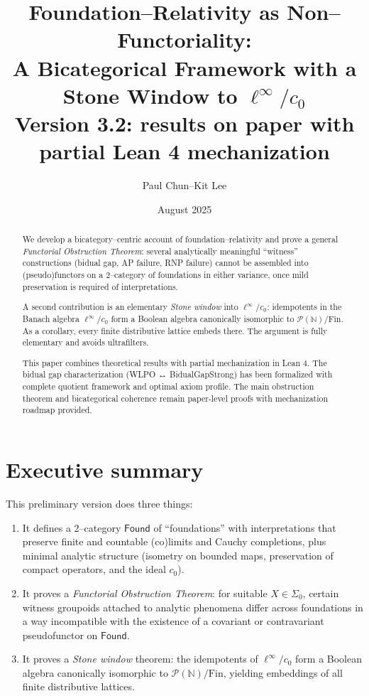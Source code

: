 \documentclass[11pt]{article}
\title{Foundation--Relativity as Non--Functoriality:\\
A Bicategorical Framework with a Stone Window to \(\ell^\infty/c_0\)\\
\large{Version 3.2: results on paper with partial Lean 4 mechanization}}
\author{Paul Chun--Kit Lee}
\date{August 2025}
\theoremstyle{definition}
\theoremstyle{remark}
\newcommand{\Found}{\mathsf{Found}}
\begin{document}
\maketitle

\begin{abstract}
We develop a bicategory--centric account of foundation--relativity and prove a general \emph{Functorial Obstruction Theorem}: several analytically meaningful ``witness'' constructions (bidual gap, AP failure, RNP failure) cannot be assembled into (pseudo)functors on a 2--category of foundations in either variance, once mild preservation is required of interpretations. 

A second contribution is an elementary \emph{Stone window} into \(\ell^\infty/c_0\): idempotents in the Banach algebra \(\ell^\infty/c_0\) form a Boolean algebra canonically isomorphic to \(\mathcal{P}(\mathbb N)/\mathrm{Fin}\). As a corollary, every finite distributive lattice embeds there. The argument is fully elementary and avoids ultrafilters.

This paper combines theoretical results with partial mechanization in Lean 4. The bidual gap characterization (WLPO ↔ BidualGapStrong) has been formalized with complete quotient framework and optimal axiom profile. The main obstruction theorem and bicategorical coherence remain paper-level proofs with mechanization roadmap provided.
\end{abstract}

\tableofcontents

\section{Executive summary}\label{sec:summary}

This preliminary version does three things:

\begin{enumerate}
\item It defines a 2--category \(\Found\) of ``foundations'' with interpretations that preserve finite and countable (co)limits and Cauchy completions, plus minimal analytic structure (isometry on bounded maps, preservation of compact operators, and the ideal \(c_0\)).

\item It proves a \emph{Functorial Obstruction Theorem}: for suitable \(X\in\Sigma_0\), certain witness groupoids attached to analytic phenomena differ across foundations in a way incompatible with the existence of a covariant or contravariant pseudofunctor on \(\Found\).

\item It proves a \emph{Stone window} theorem: the idempotents of \(\ell^\infty/c_0\) form a Boolean algebra canonically isomorphic to \(\mathcal{P}(\mathbb N)/\mathrm{Fin}\), yielding embeddings of all finite distributive lattices.
\end{enumerate}
\end{document}
